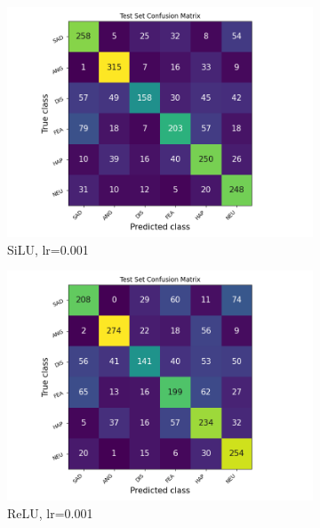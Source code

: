 \begin{figure}[h]
    \centering
    \begin{subfigure}[b]{0.32\textwidth}
        \includegraphics[width=\textwidth]{2D/lr0.001-SiLU-2D-CF.png}
        \caption{SiLU, lr=0.001}
    \end{subfigure}
    \begin{subfigure}[b]{0.32\textwidth}
        \includegraphics[width=\textwidth]{2D/lr0.001-ReLU-2D-CF.png}
        \caption{ReLU, lr=0.001}
    \end{subfigure}
    \begin{subfigure}[b]{0.32\textwidth}

\end{subfigure}
\end{figure}
